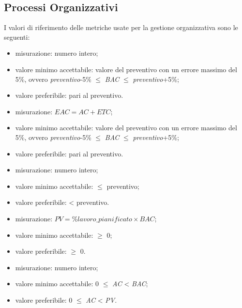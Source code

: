 \subsection{Processi Organizzativi}

	I valori di riferimento delle metriche usate per la gestione organizzativa sono le seguenti:
	
			\begin{itemize}
				\item{misurazione: numero intero;}
				\item{valore minimo accettabile: valore del preventivo con un errore massimo del 5\%, ovvero \textit{preventivo}-5\% $\leq$ \textit{BAC} $\leq$ \textit{preventivo}+5\%;}
				\item{valore preferibile: pari al preventivo.}
			\end{itemize}
		
			\begin{itemize}
				\item{misurazione: $EAC = AC + ETC$;}
				\item{valore minimo accettabile: valore del preventivo con un errore massimo del 5\%, ovvero \textit{preventivo}-5\% $\leq$ \textit{BAC} $\leq$ \textit{preventivo}+5\%;}
				\item{valore preferibile: pari al preventivo.}
			\end{itemize}
		
			\begin{itemize}
				\item{misurazione: numero intero;}
				\item{valore minimo accettabile: $\leq$ preventivo;}
				\item{valore preferibile: < preventivo.}
			\end{itemize}
		
			\begin{itemize}
				\item{misurazione: $PV = \%lavoro\_pianificato \times BAC$;}
				\item{valore minimo accettabile: $\geq$ 0;}
				\item{valore preferibile: $\geq$ 0.}
			\end{itemize}
		
			\begin{itemize}
				\item{misurazione: numero intero;}
				\item{valore minimo accettabile: 0 $\leq$ \textit{AC} < \textit{BAC};}
				\item{valore preferibile: 0 $\leq$ \textit{AC} < \textit{PV}.}
			\end{itemize}
		
